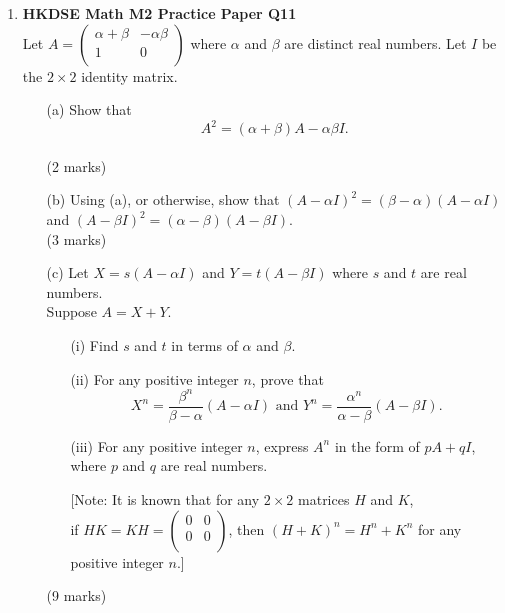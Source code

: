 \documentclass{report}
\begin{document}
\begin{enumerate}
	\newpage

	\item \textbf{HKDSE Math M2 Practice Paper Q11}\\
	Let $A = \begin{pmatrix}
		\alpha + \beta & -\alpha\beta \\
		1 & 0 \\
	\end{pmatrix}$ where $\alpha$ and $\beta$ are distinct real numbers. Let $I$ be the $2\times2$ identity matrix.  
	\begin{enumerate}
		\item [(a)]Show that $$A^2 = (\alpha +\beta)A - \alpha\beta I.$$ \\(2 marks)
		\item [(b)]Using (a), or otherwise, show that $(A - \alpha I)^2 = (\beta - \alpha)(A - \alpha I)$ and $(A - \beta I)^2 = (\alpha - \beta)(A - \beta I)$. \\(3 marks)
		\item [(c)]Let $X = s(A-\alpha I)$ and $Y = t(A-\beta I)$ where $s$ and $t$ are real numbers. \\
		Suppose $A = X + Y$.
		\begin{enumerate}
			\item [(i)]Find $s$ and $t$ in terms of $\alpha$ and $\beta$.
			\item [(ii)]For any positive integer $n$, prove that
			$$X^n = \displaystyle\frac{\beta^n}{\beta - \alpha} (A - \alpha I)\text{ and }Y^n = \displaystyle\frac{\alpha^n}{\alpha - \beta}(A - \beta I).$$
			\item [(iii)]For any positive integer $n$, express $A^n$ in the form of $pA + qI$, where $p$ and $q$ are real numbers. 
			
			[Note: It is known that for any $2\times2 $ matrices $H$ and $K$, \\
			if $HK = KH = \begin{pmatrix}
				0&0\\0&0\\
			\end{pmatrix}$, then $(H+K)^n = H^n + K^n$ for any positive integer $n$.]
		\end{enumerate}
		(9 marks)
	\end{enumerate}


\end{enumerate}
\end{document}
